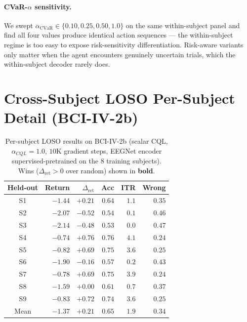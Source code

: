 \documentclass[conference]{IEEEtran}
\newcommand{\bcib}{BCI-IV-2b}
\newcommand{\cql}{CQL}
\newcommand{\cvar}{\mathrm{CVaR}}
\begin{document}
\paragraph{CVaR-$\alpha$ sensitivity.}
We swept $\alpha_{\cvar} \in \{0.10, 0.25, 0.50, 1.0\}$ on the same
within-subject panel and find all four values produce identical
action sequences --- the within-subject regime is too easy to
expose risk-sensitivity differentiation. Risk-aware variants only
matter when the agent encounters genuinely uncertain trials, which
the within-subject decoder rarely does.

\section{Cross-Subject LOSO Per-Subject Detail (\bcib{})}

\begin{table}[h]
\centering
\caption{Per-subject LOSO results on \bcib{} (scalar \cql{},
$\alpha_{\cql} = 1.0$, $10$K gradient steps, EEGNet encoder
supervised-pretrained on the 8 training subjects). Wins
($\Delta_{\text{ret}} > 0$ over random) shown in
\textbf{bold}.}
\label{tab:sup:bci2b_loso}
\footnotesize
\begin{tabular}{c r r r r r}
\toprule
Held-out & Return & $\Delta_{\text{ret}}$ & Acc & ITR & Wrong \\
\midrule
S1 & $-1.44$ & $\mathbf{+0.21}$ & $0.64$ & $1.1$ & $0.35$ \\
S2 & $-2.07$ & $-0.52$ & $0.54$ & $0.1$ & $0.46$ \\
S3 & $-2.14$ & $-0.48$ & $0.53$ & $0.0$ & $0.47$ \\
S4 & $-0.74$ & $\mathbf{+0.76}$ & $0.76$ & $4.1$ & $0.24$ \\
S5 & $-0.82$ & $\mathbf{+0.69}$ & $0.75$ & $3.6$ & $0.25$ \\
S6 & $-1.90$ & $-0.16$ & $0.57$ & $0.2$ & $0.43$ \\
S7 & $-0.78$ & $\mathbf{+0.69}$ & $0.75$ & $3.9$ & $0.24$ \\
S8 & $-1.59$ & $\mathbf{+0.00}$ & $0.61$ & $0.7$ & $0.37$ \\
S9 & $-0.83$ & $\mathbf{+0.72}$ & $0.74$ & $3.6$ & $0.25$ \\
\midrule
Mean & $-1.37$ & $+0.21$ & $0.65$ & $1.9$ & $0.34$ \\
\bottomrule
\end{tabular}
\end{table}
\end{document}
